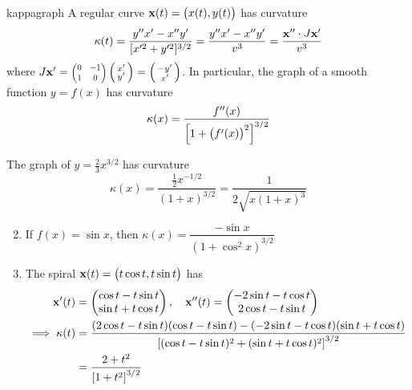 \begin{cor}{}{kappagraph}
	A regular curve ${\mathbf{x}}(t)=\bigl(x(t),y(t)\bigr)$ has curvature
	\[
		\kappa(t)=\frac{y''x'-x''y'}{[x'^2+y'^2]^{3/2}} =\frac{y''x'-x''y'}{v^3} =\frac{{\mathbf{x}}''\cdot J{\mathbf{x}}'}{v^3}
	\]
	where $J\vx'=\scalebox{0.75}{$\begin{pmatrix}
	0&-1\\1&0
	\end{pmatrix}$}\stwovec{x'}{y'}=\stwovec{-y'}{x'}$. In particular, the graph of a smooth function $y=f(x)$ has curvature
	\[
		\kappa(x)=\frac{f''(x)}{\Bigl[1+\bigl(f'(x)\bigr)^2\Bigr]^{3/2}}
	\]
\end{cor}


\begin{examples}{}{}
	\exstart The graph of $y=\frac 23x^{3/2}$ has curvature
	\[
		\kappa(x)=\frac{\frac 12x^{-1/2}}{(1+x)^{3/2}}= \frac 1{2\sqrt{x(1+x)^3}}
	\]
	\begin{enumerate}\setcounter{enumi}{1}
	  \item If $f(x)=\sin x$, then $\kappa(x)=\dfrac{-\sin x}{(1+\cos^2\!x)^{3/2}}$
	  \item The spiral ${\mathbf{x}}(t)=\bigl(t\cos t,t\sin t\bigr)$ has
	  \begin{align*}
		  {\mathbf{x}}'(t)&=\begin{pmatrix}\cos t-t\sin t\\\sin t+t\cos t\end{pmatrix},\quad {\mathbf{x}}''(t)=\begin{pmatrix}-2\sin t-t\cos t\\2\cos t-t\sin t\end{pmatrix}\\
		  \implies \kappa(t)&=\frac{(2\cos t-t\sin t)(\cos t-t\sin t)-(-2\sin t-t\cos t)(\sin t+t\cos t)}{\left[(\cos t-t\sin t)^2+(\sin t+t\cos t)^2\right]^{3/2}}\\
		  &=\frac{2+t^2}{\left[1+t^2\right]^{3/2}}
	  \end{align*}
	\end{enumerate}
\end{examples}


\clearpage

